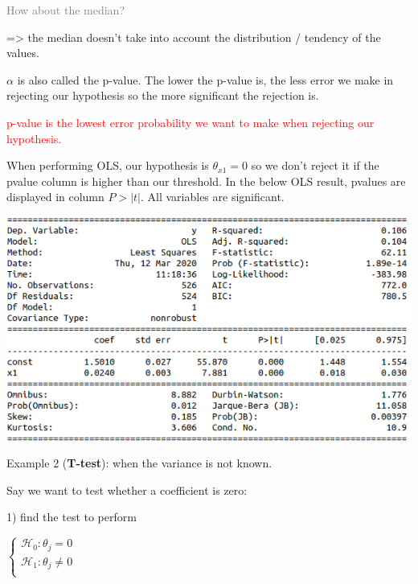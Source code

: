 \vspace{5mm}

\textcolor{gray}{How about the median?}

=> the median doesn't take into account the distribution / tendency of the values.

\vspace{5mm}

$\alpha$ is also called the p-value. The lower the p-value is, the less error we make in rejecting our hypothesis so the more significant the rejection is.

\textcolor{red}{p-value is the lowest error probability we want to make when rejecting our hypothesis.}

\vspace{5mm}

When performing OLS, our hypothesis is $\theta_{x1}=0$ so we don't reject it if the pvalue column is higher than our threshold. In the below OLS result, pvalues are displayed in column $P>|t|$. All variables are significant.

\begin{center}
\includegraphics[scale=0.5]{OLS_pvalue.png}
\end{center}

Example 2 (\textbf{T-test}):  when the variance is not known.

\vspace{5mm}

Say we want to test whether a coefficient is zero:

1) find the test to perform

\vspace{5mm}

$
\left\{
    \begin{array}{ll}
        \mathcal{H}_0: \theta_j=0 \\
        \mathcal{H}_1: \theta_j \neq 0 \\
    \end{array}
\right.
$

